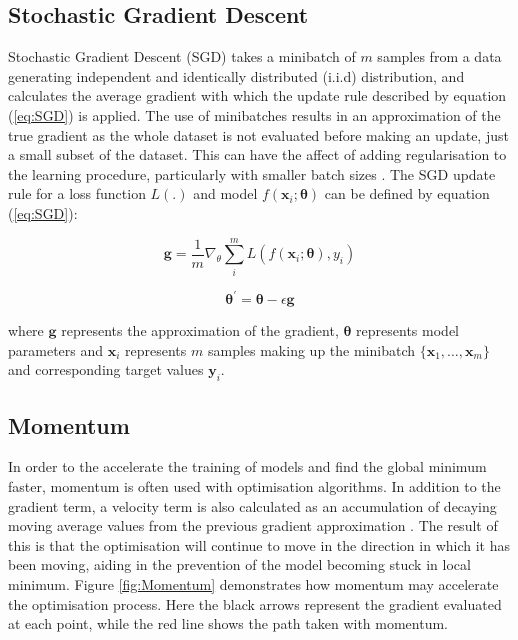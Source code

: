 \subsection{Stochastic Gradient Descent}
Stochastic Gradient Descent (SGD) takes a minibatch of $m$ samples from a data generating independent and identically distributed (i.i.d) distribution, and calculates the average gradient with which the update rule described by equation (\ref{eq:SGD}) is applied.
The use of minibatches results in an approximation of the true gradient as the whole dataset is not evaluated before making an update, just a small subset of the dataset.
This can have the affect of adding regularisation to the learning procedure, particularly with smaller batch sizes \cite{Goodfellow-et-al-2016}.
The SGD update rule for a loss function $L(.)$ and model $f(\bm{x}_i; \bm{\theta})$ can be defined by equation (\ref{eq:SGD}):

\begin{equation*}
    \bm{g} = \frac{1}{m} \nabla_\theta \sum_i^m L(f(\bm{x}_i; \bm{\theta}), y_i)
\end{equation*}

\begin{equation}\label{eq:SGD}
    \bm{\theta}^\prime = \bm{\theta} - \epsilon \bm{g}
\end{equation}

where $\bm{g}$ represents the approximation of the gradient, $\bm{\theta}$ represents model parameters and $\bm{x}_i$ represents $m$ samples making up the minibatch $\{\bm{x}_1, \dots, \bm{x}_m\}$ and corresponding target values $\bm{y}_i$.

\subsection{Momentum}
In order to the accelerate the training of models and find the global minimum faster, momentum is often used with optimisation algorithms.
In addition to the gradient term, a velocity term is also calculated as an accumulation of decaying moving average values from the previous gradient approximation \cite{Goodfellow-et-al-2016}.
The result of this is that the optimisation will continue to move in the direction in which it has been moving, aiding in the prevention of the model becoming stuck in local minimum.
Figure \ref{fig:Momentum} demonstrates how momentum may accelerate the optimisation process.
Here the black arrows represent the gradient evaluated at each point, while the red line shows the path taken with momentum.

